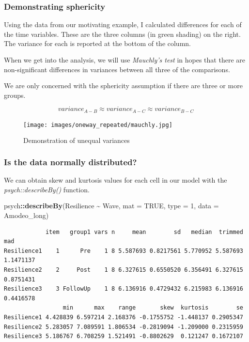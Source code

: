 \documentclass[
  11pt,
]{book}
\newenvironment{Shaded}{\begin{snugshade}}{\end{snugshade}}
\newcommand{\AttributeTok}[1]{\textcolor[rgb]{0.27,0.27,0.27}{#1}}
\newcommand{\ConstantTok}[1]{\textcolor[rgb]{0.37,0.37,0.37}{#1}}
\newcommand{\DecValTok}[1]{\textcolor[rgb]{0.06,0.06,0.06}{#1}}
\newcommand{\FunctionTok}[1]{\textcolor[rgb]{0.27,0.27,0.27}{\textbf{#1}}}
\newcommand{\NormalTok}[1]{#1}
\newcommand{\SpecialCharTok}[1]{\textcolor[rgb]{0.43,0.43,0.43}{\textbf{#1}}}
\begin{document}
\hypertarget{demonstrating-sphericity}{%
\subsubsection{Demonstrating sphericity}\label{demonstrating-sphericity}}

Using the data from our motivating example, I calculated differences for each of the time variables. These are the three columns (in green shading) on the right. The variance for each is reported at the bottom of the column.

When we get into the analysis, we will use \emph{Mauchly's test} in hopes that there are non-significant differences in variances between all three of the comparisons.

We are only concerned with the sphericity assumption if there are three or more groups.

\[variance_{A-B} \approx variance_{A-C}\approx variance_{B-C}\]

\begin{figure}
\hypertarget{id}{%
\centering
\texttt{[image: images/oneway\_repeated/mauchly.jpg]}
\caption{Demonstration of unequal variances}\label{id}
}
\end{figure}

\hypertarget{is-the-data-normally-distributed}{%
\subsubsection{Is the data normally distributed?}\label{is-the-data-normally-distributed}}

We can obtain skew and kurtosis values for each cell in our model with the \emph{psych::describeBy()} function.

\begin{Shaded}
\begin{Highlighting}[]
\NormalTok{psych}\SpecialCharTok{::}\FunctionTok{describeBy}\NormalTok{(Resilience }\SpecialCharTok{\textasciitilde{}}\NormalTok{ Wave, }\AttributeTok{mat =} \ConstantTok{TRUE}\NormalTok{, }\AttributeTok{type =} \DecValTok{1}\NormalTok{, }\AttributeTok{data =}\NormalTok{ Amodeo\_long)}
\end{Highlighting}
\end{Shaded}

\begin{verbatim}
            item   group1 vars n     mean        sd   median  trimmed       mad
Resilience1    1      Pre    1 8 5.587693 0.8217561 5.770952 5.587693 1.1471137
Resilience2    2     Post    1 8 6.327615 0.6550520 6.356491 6.327615 0.8751431
Resilience3    3 FollowUp    1 8 6.136916 0.4729432 6.215983 6.136916 0.4416578
                 min      max    range       skew  kurtosis        se
Resilience1 4.428839 6.597214 2.168376 -0.1755752 -1.448137 0.2905347
Resilience2 5.283057 7.089591 1.806534 -0.2819094 -1.209000 0.2315959
Resilience3 5.186767 6.708259 1.521491 -0.8802629  0.121247 0.1672107
\end{verbatim}
\end{document}
